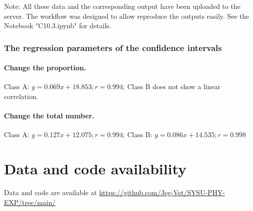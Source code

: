\documentclass[12pt,a4paper,UTF8]{article}
\begin{document}
        Note: All these data and the corresponding output have been uploaded to the server. 
        The workflow was designed to allow reproduce the outputs easily. See the Notebook "C10.3.ipynb" for details.

        \subsubsection{The regression parameters of the confidence intervals}

        \paragraph{Change the proportion.} Class A: $y = 0.069x+18.853; r=0.994$; Class B does not show a linear correlation.
        \paragraph{Change the total number.} Class A: $y = 0.127x+12.075; r=0.994$; Class B: $y = 0.086x+14.535; r=0.998$

    



\section{Data and code availability}
Data and code are available at \url{https://github.com/Jeg-Vet/SYSU-PHY-EXP/tree/main/}
\end{document}
